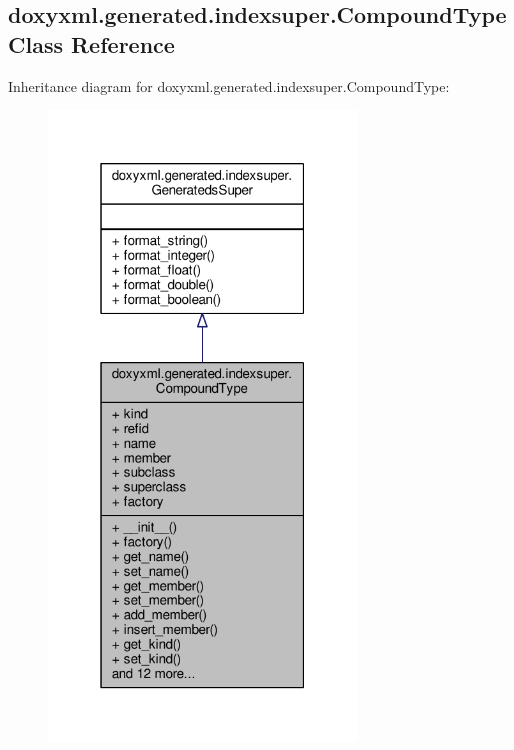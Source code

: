 \subsection{doxyxml.\+generated.\+indexsuper.\+Compound\+Type Class Reference}
\label{classdoxyxml_1_1generated_1_1indexsuper_1_1CompoundType}


Inheritance diagram for doxyxml.\+generated.\+indexsuper.\+Compound\+Type\+:
\nopagebreak
\begin{figure}[H]
\begin{center}
\leavevmode
\includegraphics[width=232pt]{dd/d18/classdoxyxml_1_1generated_1_1indexsuper_1_1CompoundType__inherit__graph}
\end{center}
\end{figure}


